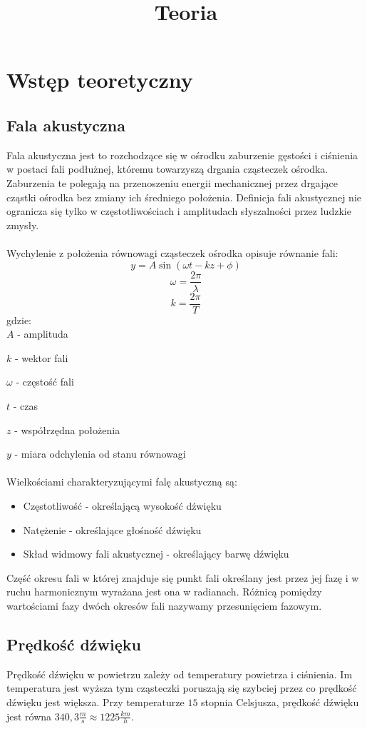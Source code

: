 \documentclass{article}
\begin{document}
\title{Teoria}
\date{}
\author{}
\maketitle
\section{Wstęp teoretyczny}
\subsection{Fala akustyczna}
Fala akustyczna jest to rozchodzące się w ośrodku zaburzenie gęstości i ciśnienia w postaci fali podłużnej, któremu towarzyszą drgania cząsteczek ośrodka. Zaburzenia te polegają na przenoszeniu energii mechanicznej przez drgające cząstki ośrodka bez zmiany ich średniego położenia. Definicja fali akustycznej nie ogranicza się tylko w częstotliwościach i amplitudach słyszalności przez ludzkie zmysły.\\\\
Wychylenie z położenia równowagi cząsteczek ośrodka opisuje równanie fali:
$$y = A\sin (\omega t - kz + \phi)$$
$$\omega = \frac{2\pi}{\lambda}$$
$$k = \frac{2\pi}{T}$$
gdzie:\\

 $A$ - amplituda
 
 $k$ - wektor fali
 
 $\omega$ - częstość fali
 
 $t$ - czas
 
 $z$ - współrzędna położenia
 
 $y$ - miara odchylenia od stanu równowagi\\\\ 
Wielkościami charakteryzującymi falę akustyczną są:
\begin{itemize}
    \item Częstotliwość - określającą wysokość dźwięku
    \item Natężenie - określające głośność dźwięku
    \item Skład widmowy fali akustycznej - określający barwę dźwięku
\end{itemize}
Część okresu fali w której znajduje się punkt fali określany jest przez jej fazę i w ruchu harmonicznym wyrażana jest ona w radianach. Różnicą pomiędzy wartościami fazy dwóch okresów fali nazywamy przesunięciem fazowym.
\subsection{Prędkość dźwięku}
Prędkość dźwięku w powietrzu zależy od temperatury powietrza i ciśnienia. Im temperatura jest wyższa tym cząsteczki poruszają się szybciej przez co prędkość dźwięku jest większa.
Przy temperaturze $15$ stopnia Celsjusza, prędkość dźwięku jest równa $340,3 \frac{m}{s} \approx 1225 \frac{km}{h}$.
\end{document}
